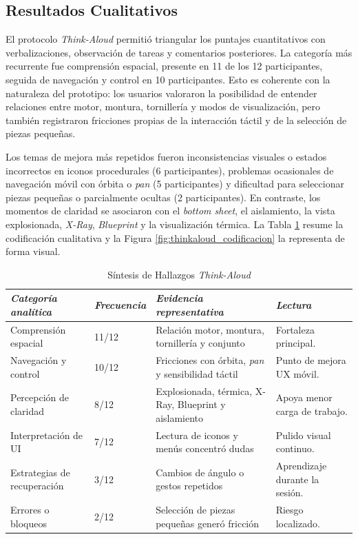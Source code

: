 \subsection{Resultados Cualitativos}

El protocolo \textit{Think-Aloud} permitió triangular los puntajes cuantitativos con verbalizaciones, observación de tareas y comentarios posteriores. La categoría más recurrente fue comprensión espacial, presente en 11 de los 12 participantes, seguida de navegación y control en 10 participantes. Esto es coherente con la naturaleza del prototipo: los usuarios valoraron la posibilidad de entender relaciones entre motor, montura, tornillería y modos de visualización, pero también registraron fricciones propias de la interacción táctil y de la selección de piezas pequeñas.

Los temas de mejora más repetidos fueron inconsistencias visuales o estados incorrectos en iconos procedurales (6 participantes), problemas ocasionales de navegación móvil con órbita o \textit{pan} (5 participantes) y dificultad para seleccionar piezas pequeñas o parcialmente ocultas (2 participantes). En contraste, los momentos de claridad se asociaron con el \textit{bottom sheet}, el aislamiento, la vista explosionada, \textit{X-Ray}, \textit{Blueprint} y la visualización térmica. La Tabla \ref{tab:thinkaloud_sintesis} resume la codificación cualitativa y la Figura \ref{fig:thinkaloud_codificacion} la representa de forma visual.

\begin{table}[htbp]
    \caption{Síntesis de Hallazgos \textit{Think-Aloud}}
    \label{tab:thinkaloud_sintesis}
    \begin{tabularx}{\textwidth}{p{3.5cm}p{1.9cm}Xp{2.4cm}}
        \hline
        \textit{Categoría analítica} & \textit{Frecuencia} & \textit{Evidencia representativa} & \textit{Lectura} \\ \hline
        Comprensión espacial & 11/12 & Relación motor, montura, tornillería y conjunto & Fortaleza principal. \\
        Navegación y control & 10/12 & Fricciones con órbita, \textit{pan} y sensibilidad táctil & Punto de mejora UX móvil. \\
        Percepción de claridad & 8/12 & Explosionada, térmica, X-Ray, Blueprint y aislamiento & Apoya menor carga de trabajo. \\
        Interpretación de UI & 7/12 & Lectura de iconos y menús concentró dudas & Pulido visual continuo. \\
        Estrategias de recuperación & 3/12 & Cambios de ángulo o gestos repetidos & Aprendizaje durante la sesión. \\
        Errores o bloqueos & 2/12 & Selección de piezas pequeñas generó fricción & Riesgo localizado. \\ \hline
    \end{tabularx}
\end{table}

